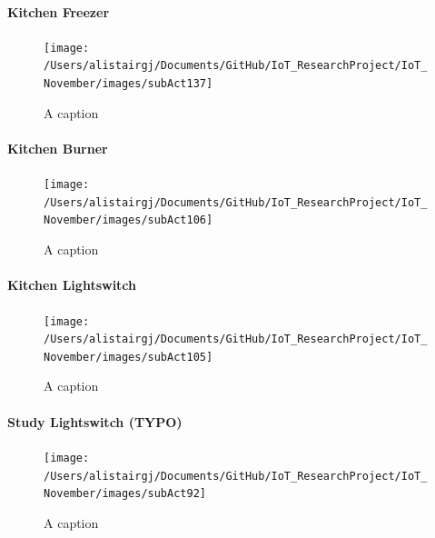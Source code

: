 \documentclass[11pt,]{article}
\let\oldparagraph\paragraph
\renewcommand{\paragraph}[1]{\oldparagraph{#1}\mbox{}}
\begin{document}
\hypertarget{kitchen-freezer}{%
\paragraph{Kitchen Freezer}\label{kitchen-freezer}}

\begin{figure}[H]

{\centering \texttt{[image: /Users/alistairgj/Documents/GitHub/IoT\_ResearchProject/IoT\_November/images/subAct137]} 

}

\caption{A caption}\label{fig:subAct137}
\end{figure}

\hypertarget{kitchen-burner}{%
\paragraph{Kitchen Burner}\label{kitchen-burner}}

\begin{figure}[H]

{\centering \texttt{[image: /Users/alistairgj/Documents/GitHub/IoT\_ResearchProject/IoT\_November/images/subAct106]} 

}

\caption{A caption}\label{fig:subAct106}
\end{figure}

\hypertarget{kitchen-lightswitch}{%
\paragraph{Kitchen Lightswitch}\label{kitchen-lightswitch}}

\begin{figure}[H]

{\centering \texttt{[image: /Users/alistairgj/Documents/GitHub/IoT\_ResearchProject/IoT\_November/images/subAct105]} 

}

\caption{A caption}\label{fig:subAct105}
\end{figure}

\hypertarget{study-lightswitch-typo}{%
\paragraph{Study Lightswitch (TYPO)}\label{study-lightswitch-typo}}

\begin{figure}[H]

{\centering \texttt{[image: /Users/alistairgj/Documents/GitHub/IoT\_ResearchProject/IoT\_November/images/subAct92]} 

}

\caption{A caption}\label{fig:subAct92}
\end{figure}
\end{document}
